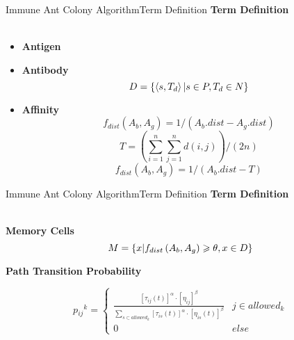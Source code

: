 \documentclass{beamer}
\begin{document}
\begin{frame}{Immune Ant Colony Algorithm}{Term Definition}
\large \textbf{Term Definition}\\~\\
\begin{itemize}
\item \textbf{Antigen}
\item \textbf{Antibody}
\begin{equation}\small{
  D=\left \{\left \langle s,T_d\right \rangle | s \in P , T_d \in N \right \}}
\end{equation}
\item \textbf{Affinity}
\small{
\begin{equation}
  f_{dist}\left(A_{b},A_{g} \right) = 1 /\left(A_{b}.dist - A_{g}.dist\right)
\end{equation}
\begin{equation}
  T = \left(\sum_{i=1}^{n} \sum_{j=1}^{n}d\left(i,j\right)\right)/\left(2n\right)
\end{equation}
\begin{equation}
  f_{dist}\left(A_{b},A_{g} \right) = 1 /\left(A_{b}.dist - T\right)
\end{equation}}
\end{itemize}
\end{frame}

\begin{frame}{Immune Ant Colony Algorithm}{Term Definition}
\large \textbf{Term Definition}\\~\\
\begin{itemize}
\item \textbf{Memory Cells}
\begin{equation} \small{
  M=\left \{ x |f_{dist} \left(A_{b},A_{g}\right)\geqslant \theta,x \in D \right \}}
\end{equation} \small{
\item \textbf{Path Transition Probability}}
\begin{equation}
p{_{ij}}^{k} =
\begin{cases}
\frac{[\tau_{ij}(t)]^\alpha \cdot [\eta_{ij}]^\beta} { \sum\limits_{s \subset allowed_{k}} [\tau_{is}(t)]^\alpha \cdot [\eta_{is}(t)]^\beta} & j \in allowed_k \\
0 & else
\end{cases}
\end{equation}
\end{itemize}
\end{frame}
\end{document}

